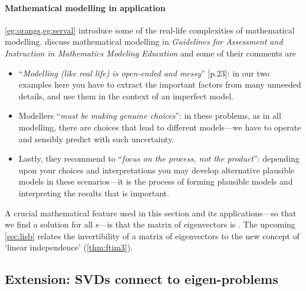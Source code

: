 \paragraph{Mathematical modelling in application}
\cref{eg:orangs,eg:serval} introduce some of the real-life complexities of mathematical modelling.
\cite{gaimme2016} discuss mathematical modelling in \emph{Guidelines for Assessment and Instruction in Mathematics Modeling Education} and some of their comments are 
\begin{itemize}
\item ``\emph{Modelling (like real life) is open-ended and messy}'' [p.23]: in our two examples here you have to extract the important factors from many unneeded details, and use them in the context of an imperfect model.
\item Modellers ``\emph{must be making genuine choices}'': in these problems, as in all modelling, there are choices that lead to different models---we have to operate and sensibly predict with such uncertainty.
\item Lastly, they recommend to ``\emph{focus on the process, not the product}'': depending upon your choices and interpretations you may develop alternative plausible models in these scenarios---it is the process of forming plausible models and interpreting the results that is important.
\end{itemize}





A crucial mathematical feature used in this section and its applications---so that we find a solution for all s---is that the matrix of eigenvectors is .
The upcoming \cref{sec:lisb} relates the invertibility of a matrix of eigenvectors to the new concept of `linear independence' (\cref{thm:ftim3}).

\subsection{Extension: SVDs connect to eigen-problems}

